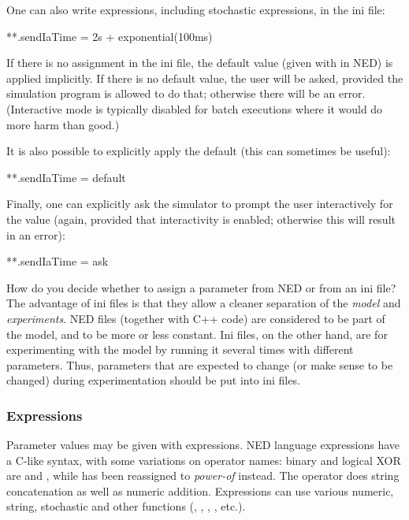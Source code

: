 One can also write expressions, including stochastic expressions, in the ini file:

\begin{inifile}
**.sendIaTime = 2s + exponential(100ms)
\end{inifile}

If there is no assignment in the ini file, the default value (given with
 in NED) is applied implicitly. If there is no default
value, the user will be asked, provided the simulation program is allowed
to do that; otherwise there will be an error. (Interactive mode is
typically disabled for batch executions where it would do more harm than
good.)

It is also possible to explicitly apply the default (this can sometimes
be useful):

\begin{inifile}
**.sendIaTime = default
\end{inifile}

Finally, one can explicitly ask the simulator to prompt the user interactively
for the value (again, provided that interactivity is enabled; otherwise
this will result in an error):

\begin{inifile}
**.sendIaTime = ask
\end{inifile}

\begin{note}
    How do you decide whether to assign a parameter from NED or from an ini
    file? The advantage of ini files is that they allow a cleaner separation of the \textit{model}
    and \textit{experiments}. NED files (together with C++ code) are considered
    to be part of the model, and to be more or less constant. Ini files, on
    the other hand, are for experimenting with the model by running it
    several times with different parameters. Thus, parameters that are expected
    to change (or make sense to be changed) during experimentation should be
    put into ini files.
\end{note}


\subsubsection{Expressions}

Parameter values may be given with expressions. NED language expressions
have a C-like syntax, with some variations on operator names: binary and
logical XOR are \ttt{\#} and \ttt{\#\#}, while \ttt{\^} has been reassigned
to \textit{power-of} instead. The \ttt{+} operator does string
concatenation as well as numeric addition. Expressions can use various
numeric, string, stochastic and other functions (, ,
, , etc.).

